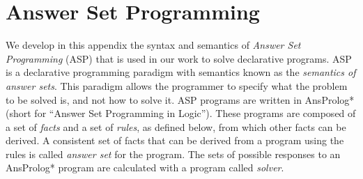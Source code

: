 
\section*{Answer Set Programming}

We develop in this appendix the syntax and semantics of \emph{Answer Set Programming} (ASP) that is used in our work to solve declarative programs.
% 
%
%
ASP is a declarative programming paradigm with semantics known as the \emph{semantics of answer sets}.
This paradigm allows the programmer to specify what the problem to be solved is, and not how to solve it.
ASP programs are written in AnsProlog* \cite{sureshkumar2006ansprolog} (short for ``Answer Set Programming in Logic'').
These programs are composed of a set of \emph{facts} and a set of \emph{rules}, as defined below, from which other facts can be derived.
A consistent set of facts that can be derived from a program using the rules is called \emph{answer set} for the program.
The sets of possible responses to an AnsProlog* program are calculated with a program called \emph{solver}.

